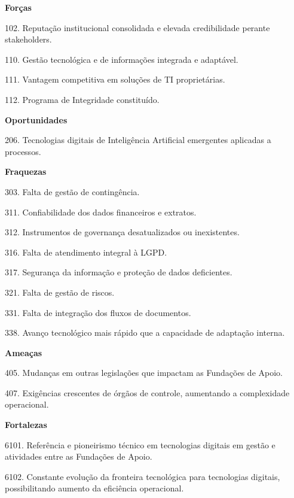 \documentclass[12pt,a4paper]{article}
\newcommand{\categoriafofa}[1]{%
  \par\vspace{\dimexpr8pt-\parskip\relax}%
  {\bfseries #1}%
  \par\vspace{\dimexpr4pt-\parskip\relax}%
}
\begin{document}
\categoriafofa{Forças}

\begin{fofa}
  \item 102. Reputação institucional consolidada e elevada credibilidade perante stakeholders.
  \item 110. Gestão tecnológica e de informações integrada e adaptável.
  \item 111. Vantagem competitiva em soluções de TI proprietárias.
  \item 112. Programa de Integridade constituído.
\end{fofa}

\categoriafofa{Oportunidades}

\begin{fofa}
  \item 206. Tecnologias digitais de Inteligência Artificial emergentes aplicadas a processos.
\end{fofa}

\categoriafofa{Fraquezas}

\begin{fofa}
  \item 303. Falta de gestão de contingência.
  \item 311. Confiabilidade dos dados financeiros e extratos.
  \item 312. Instrumentos de governança desatualizados ou inexistentes.
  \item 316. Falta de atendimento integral à LGPD.
  \item 317. Segurança da informação e proteção de dados deficientes.
  \item 321. Falta de gestão de riscos.
  \item 331. Falta de integração dos fluxos de documentos.
  \item 338. Avanço tecnológico mais rápido que a capacidade de adaptação interna.
\end{fofa}

\categoriafofa{Ameaças}

\begin{fofa}
  \item 405. Mudanças em outras legislações que impactam as Fundações de Apoio.
  \item 407. Exigências crescentes de órgãos de controle, aumentando a complexidade operacional.
\end{fofa}

\categoriafofa{Fortalezas}

\begin{fofa}
  \item 6101. Referência e pioneirismo técnico em tecnologias digitais em gestão e atividades entre as Fundações de Apoio.
  \item 6102. Constante evolução da fronteira tecnológica para tecnologias digitais, possibilitando aumento da eficiência operacional.
\end{fofa}
\end{document}
